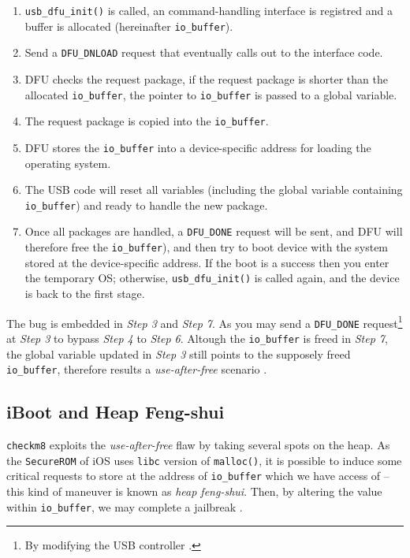 \documentclass[10pt]{article}
\newcommand{\inlinecode}{\texttt}
\begin{document}
\begin{enumerate}
    \item \inlinecode{usb\_dfu\_init()} is called, an command-handling interface is registred and a buffer is allocated (hereinafter \inlinecode{io\_buffer}).
    \item Send a \inlinecode{DFU\_DNLOAD} request that eventually calls out to the interface code.
    \item DFU checks the request package, if the request package is shorter than the allocated \inlinecode{io\_buffer}, the pointer to \inlinecode{io\_buffer} is passed to a global variable.
    \item The request package is copied into the \inlinecode{io\_buffer}.
    \item DFU stores the \inlinecode{io\_buffer} into a device-specific address for loading the operating system.
    \item The USB code will reset all variables (including the global variable containing \inlinecode{io\_buffer}) and ready to handle the new package.
    \item Once all packages are handled, a \inlinecode{DFU\_DONE} request will be sent, and DFU will therefore free the \inlinecode{io\_buffer}), and then try to boot device with the system stored at the device-specific address. If the boot is a success then you enter the temporary OS; otherwise, \inlinecode{usb\_dfu\_init()} is called again, and the device is back to the first stage.
\end{enumerate}

The bug is embedded in \textit{Step 3} and \textit{Step 7}. As you may send a \inlinecode{DFU\_DONE} request\footnote{By modifying the USB controller \cite{cite:5}.} at \textit{Step 3} to bypass \textit{Step 4} to \textit{Step 6}. Altough the \inlinecode{io\_buffer} is freed in \textit{Step 7}, the global variable updated in \textit{Step 3} still points to the supposely freed \inlinecode{io\_buffer}, therefore results a \textit{use-after-free} scenario \cite{cite:1}\cite{cite:5}.

\subsection{iBoot and Heap Feng-shui}
\inlinecode{checkm8} exploits the \textit{use-after-free} flaw by taking several spots on the heap. As the \inlinecode{SecureROM} of iOS uses \inlinecode{libc} version of \inlinecode{malloc()}, it is possible to induce some critical requests to store at the address of \inlinecode{io\_buffer} which we have access of -- this kind of maneuver is known as \textit{heap feng-shui}. Then, by altering the value within \inlinecode{io\_buffer}, we may complete a jailbreak \cite{cite:1}.
\end{document}
